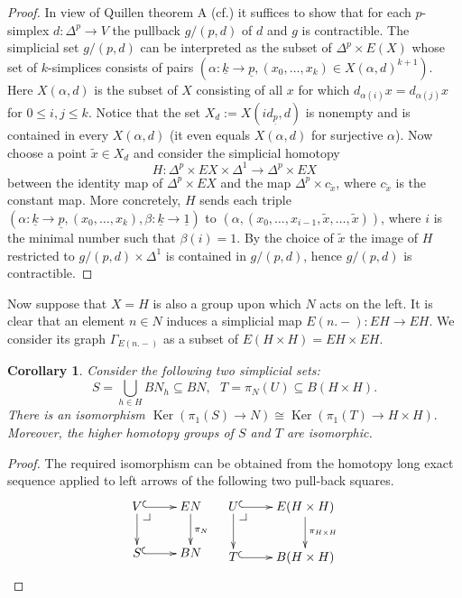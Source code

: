 \documentclass[oneside, 12pt]{amsart}
\makeatletter
\theoremstyle{plain}
\numberwithin{equation}{section}
\numberwithin{lemma}{section}
\newtheorem{cor}[lemma]{Corollary}
\theoremstyle{remark}
\theoremstyle{definition}
\DeclareMathOperator{\Ker}{Ker}
\newcommand{\pullbackcorner}[1][dr]{\save*!/#1-1.2pc/#1:(-1,1)@^{|-}\restore}
\makeatother
\begin{document}
\begin{proof}
 In view of Quillen theorem A (cf.\cite[ex.~IV.3.11]{Kbook}) it suffices to show that for each $p$-simplex $d \colon \Delta^p \to V$ the 
  pullback $g/(p, d)$ of $d$ and $g$ is contractible.
 The simplicial set $g/(p, d)$ can be interpreted as the subset of $\Delta^p \times E(X)$ whose set of $k$-simplices consists of pairs
  $(\alpha\colon \underline{k}\to \underline{p}, (x_0, \ldots, x_k)\in X(\alpha, d)^{k+1})$.
 Here $X(\alpha, d)$ is the subset of $X$ consisting of all $x$ for which $d_{\alpha(i)}x = d_{\alpha(j)}x$ for $0\leq i,j\leq k$.
 Notice that the set $X_d := X(id_{\underline{p}}, d)$ is nonempty and is contained in every $X(\alpha, d)$ (it even equals $X(\alpha, d)$ for surjective $\alpha$).
 Now choose a point $\widetilde{x}\in X_d$ and consider the simplicial homotopy \[H\colon \Delta^p \times EX \times \Delta^1 \to \Delta^p\times EX\] 
  between the identity map of $\Delta^p \times EX$ and
 the map $\Delta^p \times c_{\widetilde{x}}$, where $c_{\widetilde{x}}$ is the constant map. 
 More concretely, $H$ sends each triple $(\alpha\colon \underline{k} \to \underline{p}, (x_0, \ldots, x_k), \beta\colon \underline{k}\to\underline{1})$
 to $(\alpha, (x_0, \ldots, x_{i-1}, \widetilde{x}, \ldots, \widetilde{x}))$, where $i$ is the minimal number such that $\beta(i)=1$.
 By the choice of $\widetilde{x}$ the image of $H$ restricted to $g/(p, d)\times \Delta^1$ is contained in $g/(p, d)$, hence $g/(p, d)$ is contractible. 
\end{proof}

Now suppose that $X=H$ is also a group upon which $N$ acts on the left.
It is clear that an element $n \in N$ induces a simplicial map $E(n.-)\colon EH \to EH$.
We consider its graph $\Gamma_{E(n.-)}$ as a subset of $E(H \times H) = EH \times EH$.

\begin{cor} \label{cor:ker-iso}
Consider the following two simplicial sets:
\[ S = \bigcup\limits_{h\in H} BN_h \subseteq BN,\ \ \ T = \pi_N(U) \subseteq B(H \times H).\]
There is an isomorphism $\Ker(\pi_1(S) \to N) \cong \Ker(\pi_1(T) \to H \times H).$
Moreover, the higher homotopy groups of $S$ and $T$ are isomorphic. \end{cor}
\begin{proof}
The required isomorphism can be obtained from the homotopy long exact sequence applied to left arrows of the following two pull-back squares.
\[ \xymatrix{ V  \ar@{^{(}->}[r] \ar[d] \pullbackcorner & \ar[d]^{\pi_N} EN \\
              S \ar@{^{(}->}[r] & BN } \ \ \ 
   \xymatrix{ U  \ar@{^{(}->}[r] \ar[d] \pullbackcorner & \ar[d]^{\pi_{H \times H}} E(H \times H) \\
              T \ar@{^{(}->}[r] & B(H \times H)}  \] \end{proof}
\end{document}
